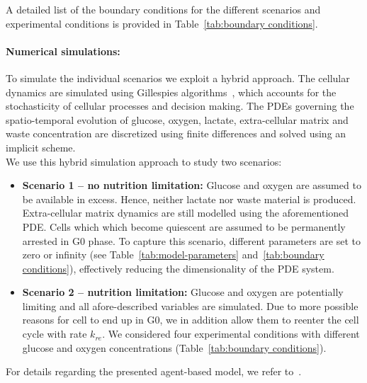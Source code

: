\documentclass[10pt,letterpaper]{article}
\begin{document}
A detailed list of the boundary conditions for the different scenarios and experimental conditions is provided in Table~\ref{tab:boundary conditions}.

\paragraph{Numerical simulations:}
To simulate the individual scenarios we exploit a hybrid approach. The cellular dynamics are simulated using Gillespies algorithms~\cite{Gillespie1977}, which accounts for the stochasticity of cellular processes and decision making. The PDEs governing the spatio-temporal evolution of glucose, oxygen, lactate, extra-cellular matrix and waste concentration are discretized using finite differences and solved using an implicit scheme.
\\[1ex]
\noindent We use this hybrid simulation approach to study two scenarios:
\begin{itemize}
%
\item \textbf{Scenario 1 -- no nutrition limitation:} Glucose and oxygen are assumed to be available in excess. Hence, neither lactate nor waste material is produced. Extra-cellular matrix dynamics are still modelled using the aforementioned PDE. Cells which which become quiescent are assumed to be permanently arrested in G0 phase. To capture this scenario, different parameters are set to zero or infinity (see Table~\ref{tab:model-parameters} and~\ref{tab:boundary conditions}), effectively reducing the dimensionality of the PDE system.
%
\item \textbf{Scenario 2 -- nutrition limitation:} Glucose and oxygen are potentially limiting and all afore-described variables are simulated. Due to more possible reasons for cell to end up in G0, we in addition allow them to reenter the cell cycle with rate $k_{re}$. We considered four experimental conditions with different glucose and oxygen concentrations (Table~\ref{tab:boundary conditions}). 
\end{itemize}
For details regarding the presented agent-based model, we refer to~\cite{Jagiella2012}.
\end{document}
